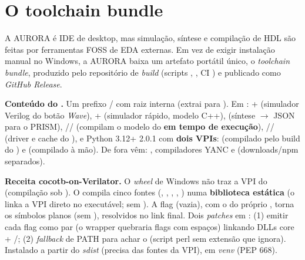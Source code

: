 \section{O toolchain bundle}
\label{sec:S11-toolchain-bundle}

A AURORA é IDE de desktop, mas simulação, síntese e compilação de HDL são feitas por ferramentas FOSS de EDA externas. Em vez de exigir instalação manual no Windows, a AURORA baixa um artefato portátil único, o \emph{toolchain bundle}, produzido pelo repositório de \emph{build}  (scripts , , CI ) e publicado como \emph{GitHub Release}.

\textbf{Conteúdo do .} Um prefixo / com raiz interna  (extrai para ). Em : + (simulador Verilog do botão \emph{Wave}), + (simulador rápido, modelo C++),  (síntese $\rightarrow$ JSON para o PRISM), // (compilam o modelo do  \textbf{em tempo de execução}), // (driver e cache do ), e Python 3.12+ 2.0.1 com \textbf{dois VPIs}:  (compilado pelo build do ) e  (compilado à mão). De fora vêm: , compiladores YANC e  (downloads/npm separados).

\textbf{Receita cocotb-on-Verilator.} O \emph{wheel} de Windows não traz a VPI do  (compilação sob ). O  compila cinco fontes (, , , , ) numa \textbf{biblioteca estática}  (o  linka a VPI direto no executável; sem ). A flag  (vazia), com o  do próprio , torna os símbolos  planos (sem ), resolvidos no link final. Dois \emph{patches} em : (1) emitir cada flag como par  (o wrapper  quebraria flags com espaços) linkando DLLs core + /; (2) \emph{fallback} de PATH para achar o  (script perl sem extensão que  ignora). Instalado a partir do \emph{sdist} (precisa das fontes da VPI), em \emph{venv} (PEP 668).

